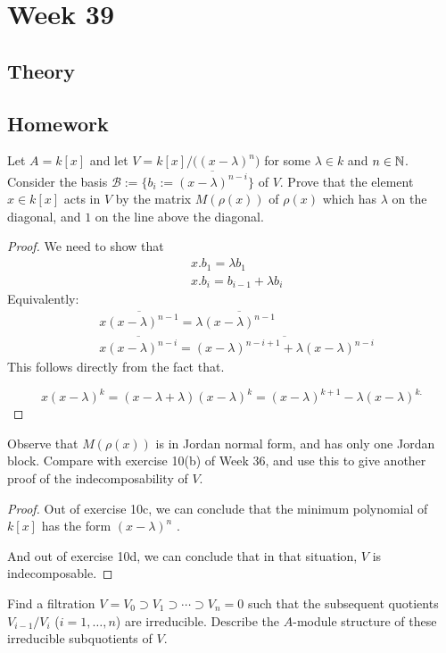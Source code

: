 \section{Week 39}

\subsection*{Theory}

\subsection*{Homework}

\begin{prop}

Let \(A=k[x]\) and let \(V=k[x]/\big((x-\lambda )^{n} \big)\) for some \(\lambda \in k\) and \(n\in \Bbb{N}\). Consider the basis \(\mathcal{B}:=\{b_{i}:=\overline{(x-\lambda )^{n-i}}\}\) of \(V\). Prove that the element \(x\in k[x]\) acts in \(V\) by the matrix \(M(\rho (x))\) of \(\rho (x)\) which has \(\lambda \) on the diagonal, and \(1\) on the line above the diagonal.
\end{prop}

\begin{proof}

We need to show that
\begin{align*}&x.b_{1}=\lambda b_{1} \\
&x.b_{i}=b_{i-1}+\lambda b_{i}\end{align*}
Equivalently:
\begin{align*}&\overline{x(x-\lambda )^{n-1}}=\lambda \overline{(x-\lambda )^{n-1}} \\
&\overline{x(x-\lambda )^{n-i}}=\overline{(x-\lambda )^{n-i+1}+\lambda (x-\lambda )^{n-i}}\end{align*}
This follows directly from the fact that.

\[x(x-\lambda )^{k} =(x-\lambda +\lambda )(x-\lambda )^{k} =(x-\lambda )^{k+1} - \lambda (x-\lambda )^{k.}\]
\end{proof}

\begin{prop}
Observe that \(M(\rho (x))\) is in Jordan normal form, and has only one Jordan block. Compare with exercise 10(b) of Week 36, and use this to give another proof of the indecomposability of \(V\).
\end{prop}

\begin{proof}
Out of exercise 10c, we can  conclude that the minimum polynomial of \(k[x]\) has the form \((x-\lambda )^{n}\) .

And out of exercise 10d, we can conclude that in that situation, \(V\) is indecomposable.
\end{proof}

\begin{prop}
Find a filtration \(V=V_{0} \supset  V_{1} \supset \cdots \supset V_{n}=0\) such that the subsequent quotients \(V_{i-1}/V_{i}\) (\(i=1,\ldots ,n\)) are irreducible. Describe the \(A\)-module structure of these irreducible subquotients of \(V\).
\end{prop}
